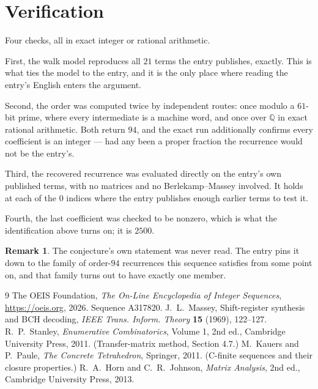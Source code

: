 \documentclass[11pt,a4paper]{article}
\theoremstyle{plain}
\theoremstyle{definition}
\newtheorem{remark}[theorem]{Remark}
\begin{document}
\section{Verification}

Four checks, all in exact integer or rational arithmetic.

First, the walk model reproduces all $21$ terms the entry publishes, exactly. This is
what ties the model to the entry, and it is the only place where reading the entry's English
enters the argument.

Second, the order was computed twice by independent routes: once modulo a $61$-bit prime, where
every intermediate is a machine word, and once over $\mathbb{Q}$ in exact rational arithmetic.
Both return $94$, and the exact run additionally confirms every coefficient is an integer
--- had any been a proper fraction the recurrence would not be the entry's.

Third, the recovered recurrence was evaluated directly on the entry's own published terms, with
no matrices and no Berlekamp--Massey involved. It holds at each of the $0$ indices where
the entry publishes enough earlier terms to test it.

Fourth, the last coefficient was checked to be nonzero, which is what the identification above
turns on; it is $2500$.

\begin{remark}
The conjecture's own statement was never read. The entry pins it down to the family of
order-$94$ recurrences this sequence satisfies from some point on, and that family turns
out to have exactly one member.
\end{remark}

\begin{thebibliography}{9}
 The OEIS Foundation, \emph{The On-Line Encyclopedia of Integer
Sequences}, \url{https://oeis.org}, 2026. Sequence A317820.
 J.~L.~Massey, Shift-register synthesis and BCH decoding, \emph{IEEE
Trans. Inform. Theory} \textbf{15} (1969), 122--127.
 R.~P.~Stanley, \emph{Enumerative Combinatorics}, Volume 1, 2nd ed.,
Cambridge University Press, 2011. (Transfer-matrix method, Section 4.7.)
 M.~Kauers and P.~Paule, \emph{The Concrete Tetrahedron}, Springer, 2011.
(C-finite sequences and their closure properties.)
 R.~A.~Horn and C.~R.~Johnson, \emph{Matrix Analysis}, 2nd ed., Cambridge
University Press, 2013.
\end{thebibliography}
\end{document}

